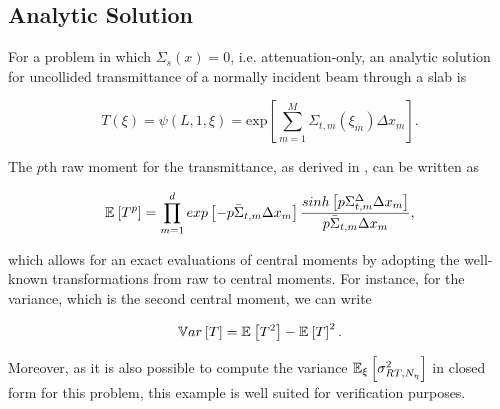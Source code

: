 \subsection{Analytic Solution}
\label{kbc:sec:analytic}
For a problem in which $\Sigma_s(x) = 0$, i.e. attenuation-only, an analytic solution for uncollided transmittance of a normally incident beam through a slab is

\begin{equation}
	\label{kbc:eq:trans}
	T(\xi) = \psi(L, 1, \xi) = \text{exp} \left[ \sum_{m=1}^M \Sigma_{t,m}(\xi_m) \Delta x_m \right].
\end{equation}

\noindent The $p$th raw moment for the transmittance, as derived in \cite{kbc:OlsonANS2017}, can be written as

\begin{equation}
	\label{kbc:eq:moment}
	\mathbb{E}_{} \left[ T^p \right] = \prod_{m=1}^d exp \left[ -p \bar{\Sigma}_{t,m}\Delta x_m \right] \frac{sinh \left[ p \Sigma_{t,m}^{\Delta} \Delta x_m \right]}{p \bar{\Sigma}_{t,m}\Delta x_m},
\end{equation}

\noindent which allows for an exact evaluations of central moments by adopting the well-known transformations from raw to central moments. For instance, for the variance, which is the second central moment, we can write

\begin{equation}
	\mathbb{V}ar_{} \left[ T \right] = \mathbb{E}_{} \left[ T^2 \right] - \mathbb{E}_{} \left[ T \right]^2.
\end{equation}

Moreover, as it is also possible to compute the variance $\mathbb{E}_\xi\left[ \sigma^2_{RT,N_\eta} \right]$ in closed form for this problem, this example is well suited for verification purposes.  


